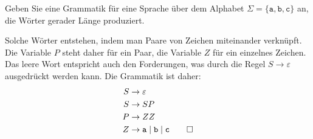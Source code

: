 Geben Sie eine Grammatik für eine Sprache über dem Alphabet
$\Sigma=\{\texttt{a},\texttt{b},\texttt{c}\}$ an, die Wörter gerader
Länge produziert.

\begin{loesung}
Solche Wörter entstehen, indem man Paare von Zeichen miteinander
verknüpft.
Die Variable $P$ steht daher für ein Paar, die Variable $Z$ für ein
einzelnes Zeichen.
Das leere Wort entspricht auch den Forderungen, was durch die Regel
$S\to\varepsilon$ ausgedrückt werden kann.
Die Grammatik ist daher:
\begin{align*}
S&\to \varepsilon \\
S&\to SP \\
P&\to ZZ \\
Z&\to \texttt{a} \mid \texttt{b} \mid \texttt{c}
\qedhere
\end{align*}
\end{loesung}
